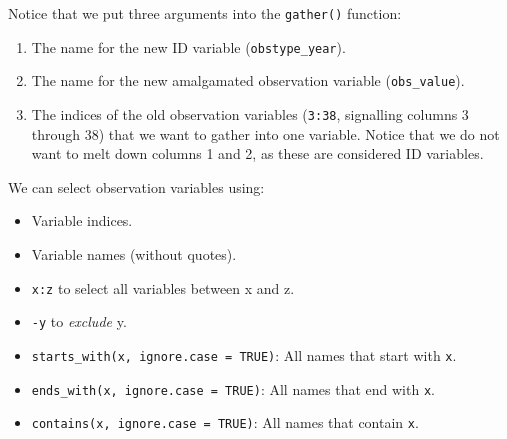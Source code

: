 \documentclass[
]{book}
\newenvironment{Shaded}{\begin{snugshade}}{\end{snugshade}}
\newcommand{\CommentTok}[1]{\textcolor[rgb]{0.56,0.35,0.01}{\textit{#1}}}
\newcommand{\DecValTok}[1]{\textcolor[rgb]{0.00,0.00,0.81}{#1}}
\newcommand{\KeywordTok}[1]{\textcolor[rgb]{0.13,0.29,0.53}{\textbf{#1}}}
\newcommand{\NormalTok}[1]{#1}
\newcommand{\OperatorTok}[1]{\textcolor[rgb]{0.81,0.36,0.00}{\textbf{#1}}}
\newcommand{\StringTok}[1]{\textcolor[rgb]{0.31,0.60,0.02}{#1}}
\providecommand{\tightlist}{%
  \setlength{\itemsep}{0pt}\setlength{\parskip}{0pt}}
\begin{document}
\begin{Shaded}
\end{Shaded}

Notice that we put three arguments into the \texttt{gather()} function:

\begin{enumerate}
\def\labelenumi{\arabic{enumi}.}
\tightlist
\item
  The name for the new ID variable (\texttt{obstype\_year}).
\item
  The name for the new amalgamated observation variable (\texttt{obs\_value}).
\item
  The indices of the old observation variables (\texttt{3:38}, signalling columns 3 through 38) that we want to gather into one variable. Notice that we do not want to melt down columns 1 and 2, as these are considered ID variables.
\end{enumerate}

We can select observation variables using:

\begin{itemize}
\tightlist
\item
  Variable indices.
\item
  Variable names (without quotes).
\item
  \texttt{x:z} to select all variables between x and z.
\item
  \texttt{-y} to \emph{exclude} y.
\item
  \texttt{starts\_with(x,\ ignore.case\ =\ TRUE)}: All names that start with \texttt{x}.
\item
  \texttt{ends\_with(x,\ ignore.case\ =\ TRUE)}: All names that end with \texttt{x}.
\item
  \texttt{contains(x,\ ignore.case\ =\ TRUE)}: All names that contain \texttt{x}.
\end{itemize}
\end{document}
